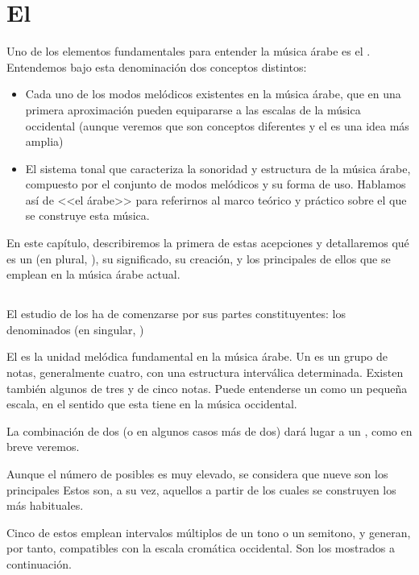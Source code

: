 \chapter{El \maqam}
\label{maqam}

Uno de los elementos fundamentales para entender la música árabe es el \maqamb. Entendemos bajo esta denominación dos conceptos distintos:

\begin{itemize}
\item Cada uno de los modos melódicos existentes en la música árabe, que en una primera aproximación pueden equipararse a las escalas de la música occidental (aunque veremos que son conceptos diferentes y el \maqam es una idea más amplia)
\item El sistema tonal que caracteriza la sonoridad y estructura de la música árabe, compuesto por el conjunto de modos melódicos y su forma de uso. Hablamos así de <<el \maqam árabe>> para referirnos al marco teórico y práctico sobre el que se construye esta música.
\end{itemize}

En este capítulo, describiremos la primera de estas acepciones y detallaremos qué es un \maqam (en plural, \maqamaatb), su significado, su creación, y los principales de ellos que se emplean en la música árabe actual.

\section{\Yins}

El estudio de los \maqam ha de comenzarse por sus partes constituyentes: los denominados \ashnas (en singular, \yinsb)

El \yins es la unidad melódica fundamental en la música árabe. Un \yins es un grupo de notas, generalmente cuatro, con una estructura interválica determinada. Existen también algunos \ashnas de tres y de cinco notas. Puede entenderse un \yins como un pequeña escala, en el sentido que esta tiene en la música occidental.

La combinación de dos \ashnas (o en algunos casos más de dos) dará lugar a un \maqamb, como en breve veremos.

Aunque el número de \ashnas posibles es muy elevado, se considera que nueve son los principales Estos son, a su vez, aquellos a partir de los cuales se construyen los \maqamaat más habituales.

Cinco de estos \ashnas emplean intervalos múltiplos de un tono o un semitono, y generan, por tanto, \maqamaat compatibles con la escala cromática occidental. Son los mostrados a continuación.

